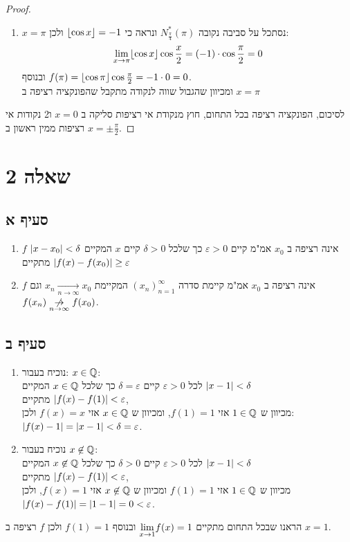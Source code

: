 \documentclass{article}
\begin{document}
\begin{proof}
\begin{enumerate}
			\item $x = \pi$ נסתכל על סביבה נקובה $N^{*}_{\frac{\pi}{4}}(\pi)$ ונראה כי $\lfloor \cos x \rfloor = -1$ ולכן:
			\[
				\displaystyle{\lim_{x \to \pi}} \lfloor \cos x \rfloor \cos \frac{x}{2} =
				(-1)\cdot \cos \frac{\pi}{2} = 0
			\]
			ובנוסף $f(\pi) = \lfloor \cos \pi \rfloor\cos \frac{\pi}{2}=-1 \cdot 0 = 0$. \\
			ומכיוון שהגבול שווה לנקודה מתקבל שהפונקציה רציפה ב $x = \pi$
		\end{enumerate}
		לסיכום, הפונקציה רציפה בכל התחום, חוץ מנקודת אי רציפות סליקה ב $x = 0$ ו2 נקודות אי רציפות ממין ראשון ב $x = \pm \frac{\pi}{2}$.
	\end{proof}

	\section*{שאלה 2}
	\subsection*{סעיף א}
	\begin{enumerate}
		\item $f$ אינה רציפה ב $x_0$ אמ"מ קיים $\varepsilon > 0$ כך שלכל $\delta > 0$ קיים $x$ המקיים $\left| x - x_0 \right| < \delta$
		מתקיים $\left| f(x)-f(x_0) \right| \geq \varepsilon$
		\item $f$ אינה רציפה ב $x_0$ אמ"מ קיימת סדרה $(x_n)^\infty_{n=1}$ המקיימת $x_n \underset{n \to \infty}\to x_0$
		וגם $f(x_n) \centernot{\underset{n \to \infty}\to} f(x_0)$.
	\end{enumerate}

	\subsection*{סעיף ב}
	\begin{enumerate}
		\item נוכיח בעבור: $x \in \mathbb{Q}$: \\
		לכל $\varepsilon > 0$ קיים $\delta = \varepsilon$
		כך שלכל $x \in \mathbb{Q}$ המקיים $\left| x - 1 \right| < \delta$ \\
		מתקיים $\left| f(x)-f(1) \right| < \varepsilon$, \\
		מכיוון ש $1 \in \mathbb{Q}$ אזי $f(1) = 1$, ומכיוון ש $x \in \mathbb{Q}$ אזי $f(x) = x$ ולכן: \\
		$\left| f(x)-1 \right| = \left| x-1 \right| < \delta = \varepsilon$.

		\item נוכיח בעבור $x \not\in \mathbb{Q}$: \\
		לכל $\varepsilon > 0$ קיים $\delta > 0$ כך שלכל $x \not\in \mathbb{Q}$
		המקיים $\left| x-1 \right| < \delta$ \\
		 מתקיים $\left| f(x)-f(1) \right| < \varepsilon$, \\
		מכיוון ש $1 \in \mathbb{Q}$ אזי $f(1)=1$ ומכיוון ש $x \not\in \mathbb{Q}$ אזי $f(x) = 1$, ולכן
		$\left| f(x)-f(1) \right| = |1-1| = 0 < \varepsilon$.
	\end{enumerate}
	הראנו שבכל התחום מתקיים $\displaystyle{\lim_{x \to 1}} f(x) = 1$ ובנוסף $f(1)=1$ ולכן $f$ רציפה ב $x=1$.
\end{document}
